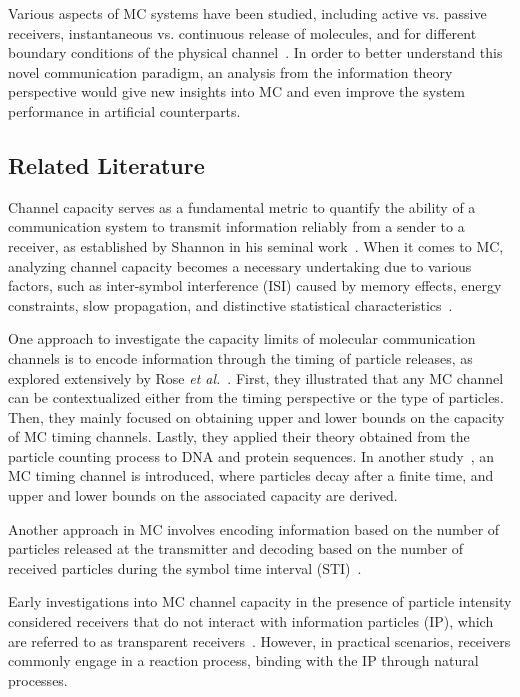 \documentclass[journal]{IEEEtranTCOM}
\begin{document}
Various aspects of MC systems have been studied, including active vs. passive receivers, instantaneous vs. continuous release of molecules, and for different boundary conditions of the physical channel~\cite{jamali2019channel}. In order to better understand this novel communication paradigm, an analysis from the information theory perspective would give new insights into MC and even improve the system performance in artificial counterparts. 
\subsection{Related Literature}
\par Channel capacity serves as a fundamental metric to quantify the ability of a communication system to transmit information reliably from a sender to a receiver, as established by Shannon in his seminal work~\cite{shannon1948mathematical}. When it comes to MC, analyzing channel capacity becomes a necessary undertaking due to various factors, such as inter-symbol interference (ISI) caused by memory effects, energy constraints, slow propagation, and distinctive statistical characteristics~\cite{gohari2016information}.

One approach to investigate the capacity limits of molecular communication channels is to encode information through the timing of particle releases, as explored extensively by Rose \textit{et al.}~\cite{rose2016inscribed}. First, they illustrated that any MC channel can be contextualized either from the timing perspective or the type of particles. Then, they mainly focused on obtaining upper and lower bounds on the capacity of MC timing channels. Lastly, they applied their theory obtained from the particle counting process to DNA and protein sequences. In another study~\cite{farsad2018capacity}, an MC timing channel is introduced, where particles decay after a finite time, and upper and lower bounds on the associated capacity are derived.

Another approach in MC involves encoding information based on the number of particles released at the transmitter and decoding based on the number of received particles during the symbol time interval (STI)~\cite{farsad2020capacities}.

Early investigations into MC channel capacity in the presence of particle intensity considered receivers that do not interact with information particles (IP), which are referred to as transparent receivers~\cite{pierobon2012capacity}. However, in practical scenarios, receivers commonly engage in a reaction process, binding with the IP through natural processes.
\end{document}

